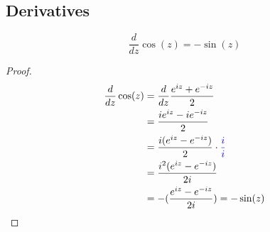 \documentclass[]{article}
\begin{document}
\subsection{Derivatives}
\[\frac{d}{dz} \cos(z) = -\sin(z) \]

\begin{proof}
	\[\begin{aligned}
		\frac{d}{dz} \cos(z)
		&= \frac{d}{dz} \frac{e^{iz} + e^{-iz}}{2} \\
		&= \frac{ie^{iz} - ie^{-iz}}{2} \\
		&= \frac{i(e^{iz} - e^{-iz})}{2} \cdot \color{blue}\frac{i}{i} \\
		&= \frac{i^2(e^{iz} - e^{-iz})}{2i} \\
		&= -(\frac{e^{iz} - e^{-iz}}{2i}) = -\sin(z)
	\end{aligned}\]
\end{proof}
\end{document}
